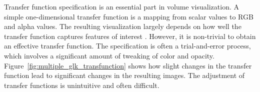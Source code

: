 Transfer function specification is an essential part in volume visualization.
A simple one-dimensional transfer function is a mapping from scalar values to RGB and alpha values.
The resulting visualization largely depends on how well the transfer function captures features of interest \cite{kniss_multidimensional_2002}.
However, it is non-trivial to obtain an effective transfer function. The specification is often a trial-and-error process, which involves a significant amount of tweaking of color and opacity. Figure~\ref{fig:multiple_glk_transfunction} shows how slight changes in the transfer function lead to significant changes in the resulting images. The adjustment of transfer functions is unintuitive and often difficult.

